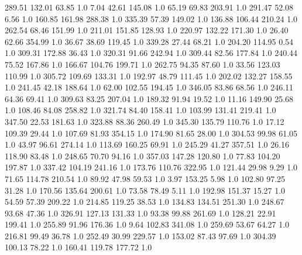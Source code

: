     289.51    132.01     63.85  1.0
      7.04     42.61    145.08  1.0
     65.19     69.83    203.91  1.0
    291.47     52.08      6.56  1.0
    160.85    161.98    288.38  1.0
    335.39     57.39    149.02  1.0
    136.88    106.44    210.24  1.0
    262.54     68.46    151.99  1.0
    211.01    151.85    128.93  1.0
    220.97    132.22    171.30  1.0
     26.40     62.66    354.99  1.0
     36.67     38.69    119.45  1.0
    339.28     27.44     68.21  1.0
    204.20    114.95      0.54  1.0
    309.31    172.88     36.43  1.0
    320.31     91.66    242.94  1.0
    309.44     82.56    177.84  1.0
    240.44     75.52    167.86  1.0
    166.67    104.76    199.71  1.0
    262.75     94.35     87.60  1.0
     33.56    123.03    110.99  1.0
    305.72    109.69    133.31  1.0
    192.97     48.79    111.45  1.0
    202.02    132.27    158.55  1.0
    241.45     42.18    188.64  1.0
     62.00    102.55    194.45  1.0
    346.05     83.86     68.56  1.0
    246.11     64.36     69.41  1.0
    309.63     83.25    207.04  1.0
    189.32     91.94     19.52  1.0
     11.16    149.90     25.68  1.0
    108.46     84.08    258.82  1.0
    321.74     84.40    158.41  1.0
    103.99    131.41    219.41  1.0
    347.50     22.53    181.63  1.0
    323.88     88.36    260.49  1.0
    345.30    135.79    110.76  1.0
     17.12    109.39     29.44  1.0
    107.69     81.93    354.15  1.0
    174.90     81.65     28.00  1.0
    304.53     99.98     61.05  1.0
     43.97     96.61    274.14  1.0
    113.69    160.25     69.91  1.0
    245.29     41.27    357.51  1.0
     26.16    118.90     83.48  1.0
    248.65     70.70     94.16  1.0
    357.03    147.28    120.80  1.0
     77.83    104.20    197.87  1.0
    337.42    104.19    241.16  1.0
    173.76    110.76    322.95  1.0
    121.44     29.98      9.29  1.0
     71.65    114.78    210.54  1.0
     89.92     47.98     59.53  1.0
      3.97    153.25      5.98  1.0
    102.80     97.25     31.28  1.0
    170.56    135.64    200.61  1.0
     73.58     78.49      5.11  1.0
    192.98    151.37     15.27  1.0
     54.59     57.39    209.22  1.0
    214.85    119.25     38.53  1.0
    134.83    134.51    251.30  1.0
    248.67     93.68     47.36  1.0
    326.91    127.13    131.33  1.0
     93.38     99.88    261.69  1.0
    128.21     22.91    199.41  1.0
    255.89     91.96    176.36  1.0
      9.64    102.83    341.08  1.0
    259.69     53.67     64.27  1.0
    216.81     99.49     36.78  1.0
    252.49     30.99    229.57  1.0
    153.02     87.43     97.69  1.0
    304.39    100.13     78.22  1.0
    160.41    119.78    177.72  1.0
